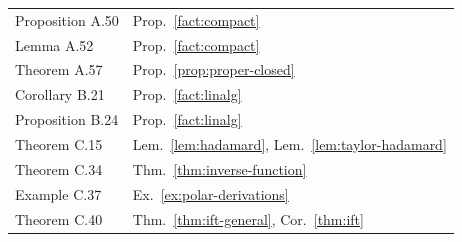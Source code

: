 \documentclass[11pt]{report}
\begin{document}
{\begin{longtable}{>{\raggedright\arraybackslash}p{3.6cm} >{\raggedright\arraybackslash}p{11.2cm}}
Proposition A.50 & Prop.~\ref{fact:compact} \\
Lemma A.52 & Prop.~\ref{fact:compact} \\
Theorem A.57 & Prop.~\ref{prop:proper-closed} \\
Corollary B.21 & Prop.~\ref{fact:linalg} \\
Proposition B.24 & Prop.~\ref{fact:linalg} \\
Theorem C.15 & Lem.~\ref{lem:hadamard}, Lem.~\ref{lem:taylor-hadamard} \\
Theorem C.34 & Thm.~\ref{thm:inverse-function} \\
Example C.37 & Ex.~\ref{ex:polar-derivations} \\
Theorem C.40 & Thm.~\ref{thm:ift-general}, Cor.~\ref{thm:ift} \\
\bottomrule
\end{longtable}
}
\end{document}
